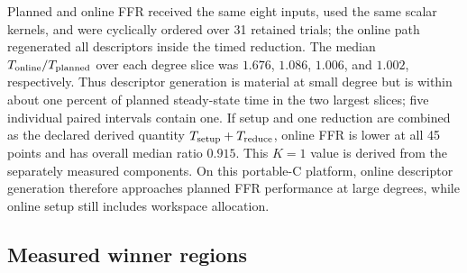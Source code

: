 \documentclass{mcom-l}
\numberwithin{equation}{section}
\theoremstyle{definition}
\theoremstyle{remark}
\begin{document}
Planned and online FFR received the same eight inputs, used the same scalar
kernels, and
were cyclically ordered over 31 retained trials; the online path regenerated
all descriptors inside the timed reduction.  The median
$T_{\rm online}/T_{\rm planned}$ over each degree slice was $1.676$, $1.086$,
$1.006$, and $1.002$, respectively.  Thus descriptor generation is material
at small degree but is within about one percent of planned steady-state time
in the two largest slices; five individual paired intervals contain one.  If
setup and one reduction are combined as the declared derived quantity
$T_{\rm setup}+T_{\rm reduce}$, online FFR is lower at all 45 points and has
overall median ratio $0.915$.  This $K=1$ value is derived from the separately
measured components.  On this portable-C platform, online descriptor
generation therefore approaches planned FFR performance at large degrees,
while online setup still includes workspace allocation.

\subsection{Measured winner regions}
\end{document}
